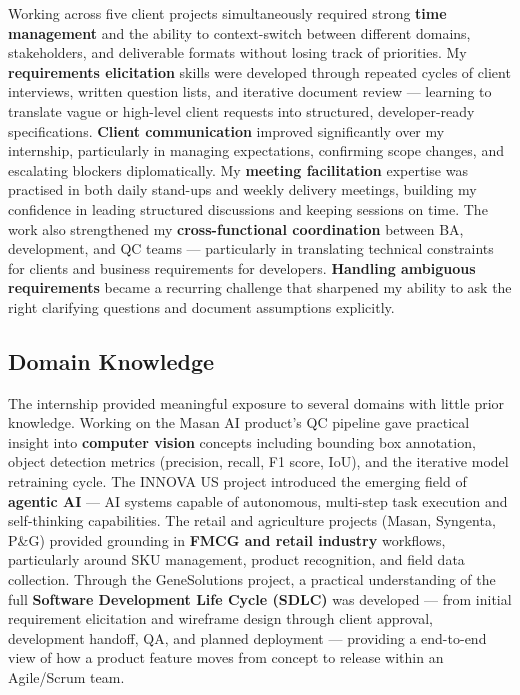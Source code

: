 Working across five client projects simultaneously required strong \textbf{time management} and the ability to context-switch between different domains, stakeholders, and deliverable formats without losing track of priorities. My \textbf{requirements elicitation} skills were developed through repeated cycles of client interviews, written question lists, and iterative document review — learning to translate vague or high-level client requests into structured, developer-ready specifications. \textbf{Client communication} improved significantly over my internship, particularly in managing expectations, confirming scope changes, and escalating blockers diplomatically. My \textbf{meeting facilitation} expertise was practised in both daily stand-ups and weekly delivery meetings, building my confidence in leading structured discussions and keeping sessions on time. The work also strengthened my \textbf{cross-functional coordination} between BA, development, and QC teams — particularly in translating technical constraints for clients and business requirements for developers. \textbf{Handling ambiguous requirements} became a recurring challenge that sharpened my ability to ask the right clarifying questions and document assumptions explicitly.

\subsection{Domain Knowledge}

The internship provided meaningful exposure to several domains with little prior knowledge. Working on the Masan AI product's QC pipeline gave practical insight into \textbf{computer vision} concepts including bounding box annotation, object detection metrics (precision, recall, F1 score, IoU), and the iterative model retraining cycle. The INNOVA US project introduced the emerging field of \textbf{agentic AI} — AI systems capable of autonomous, multi-step task execution and self-thinking capabilities. The retail and agriculture projects (Masan, Syngenta, P\&G) provided grounding in \textbf{FMCG and retail industry} workflows, particularly around SKU management, product recognition, and field data collection. Through the GeneSolutions project, a practical understanding of the full \textbf{Software Development Life Cycle (SDLC)} was developed — from initial requirement elicitation and wireframe design through client approval, development handoff, QA, and planned deployment — providing a end-to-end view of how a product feature moves from concept to release within an Agile/Scrum team.
